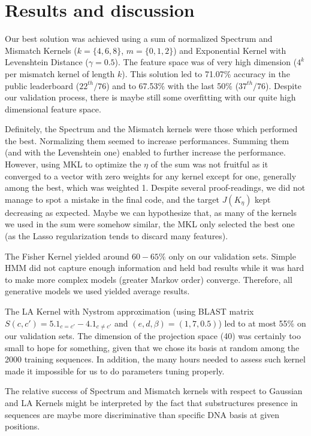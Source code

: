 \documentclass[11pt,twocolumn,letterpaper]{article}
\begin{document}
\section{Results and discussion}

Our best solution was achieved using a sum of normalized Spectrum and Mismatch Kernels ($k = \{4, 6, 8\}$, $m =\{0, 1, 2\}$) and Exponential Kernel with Levenshtein Distance ($\gamma = 0.5$). The feature space was of very high dimension ($4^k$ per mismatch kernel of length $k$). This solution led to 71.07\% accuracy in the public leaderboard ($22^{th}/76$) and to 67.53\% with the last 50\% ($37^{th}/76$). Despite our validation process, there is maybe still some overfitting with our quite high dimensional feature space.

Definitely, the Spectrum and the Mismatch kernels were those which performed the best. Normalizing them seemed to increase performances. Summing them (and with the Levenshtein one) enabled to further increase the performance. However, using MKL to optimize the $\eta$ of the sum was not fruitful as it converged to a vector with zero weights for any kernel except for one, generally among the best, which was weighted 1. Despite several proof-readings, we did not manage to spot a mistake in the final code, and the target $J(K_{\eta})$ kept decreasing as expected. Maybe we can hypothesize that, as many of the kernels we used in the sum were somehow similar, the MKL only selected the best one (as the Lasso regularization tends to discard many features). 

The Fisher Kernel yielded around $60-65\%$ only on our validation sets. Simple HMM did not capture enough information and held bad results while it was hard to make more complex models (greater Markov order) converge. Therefore, all generative models we used yielded average results. 

The LA Kernel with Nystrom approximation (using BLAST matrix $S(c,c')=5.1_{c=c'} - 4.1_{c \neq c'}$ and $(e,d, \beta)=(1,7, 0.5)$) led to at most 55\% on our validation sets. The dimension of the projection space (40) was certainly too small to hope for something, given that we chose its basis at random among the 2000 training sequences. In addition, the many hours needed to assess such kernel made it impossible for us to do parameters tuning properly.

The relative success of Spectrum and Mismatch kernels with respect to Gaussian and LA Kernels might be interpreted by the fact that substructures presence in sequences are maybe more discriminative than specific DNA basis at given positions.
\end{document}
